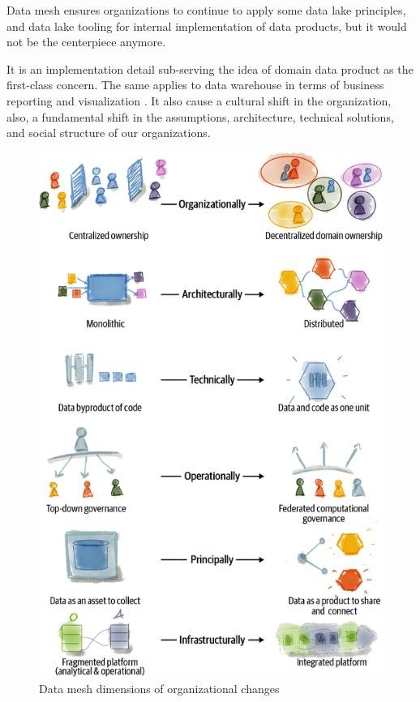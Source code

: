 \documentclass[12pt, a4paper]{book}
\begin{document}
Data mesh ensures organizations to continue to apply some data lake principles, and data lake tooling for internal implementation of data products, but it would not be the centerpiece anymore.

It is an implementation detail sub-serving the idea of domain data product as the first-class concern. The same applies to data warehouse in terms of business reporting and visualization \cite{shiftkpmg}. It also cause a cultural shift in the organization, also, a fundamental shift in the assumptions, architecture, technical solutions, and social structure of our organizations. \cite{datamesh2022ch1}

\begin{figure}[ht]
	\begin{framed}
		\centering
		\includegraphics[width=12cm]{OrgChanges.png}
		\caption{Data mesh dimensions of organizational changes}
		\label{orgchange}
	\end{framed}
\end{figure}
\end{document}
